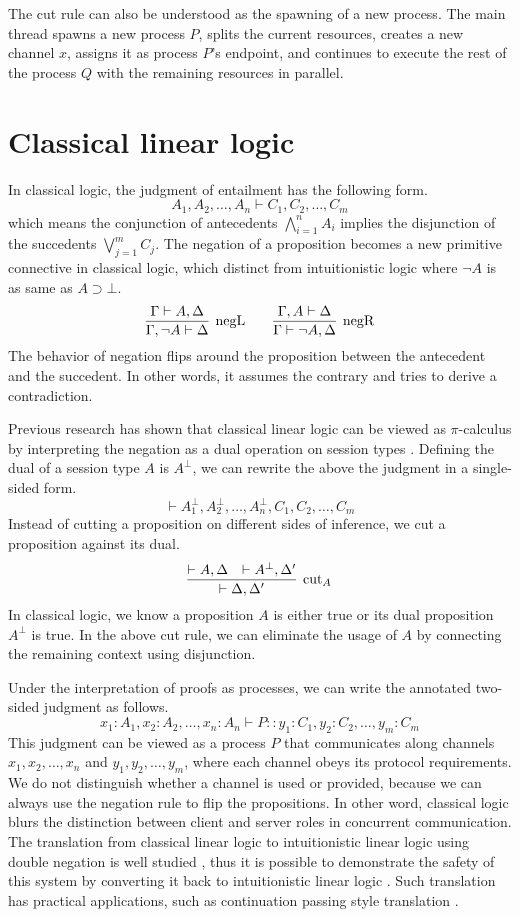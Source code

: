 \documentclass[12pt, openany]{memoir}
\begin{document}
The cut rule can also be understood as the spawning of a new process. 
The main thread spawns a new process $P$, splits the current resources, creates a new channel $x$,
assigns it as process $P$'s endpoint, and continues to execute the rest of the process $Q$ with the remaining resources in parallel.
\section{Classical linear logic} \label{sec:cll}
In classical logic, the judgment of entailment has the following form.
\[
  A_1, A_2, \ldots, A_n \vdash C_1, C_2, \ldots, C_m
\]
which means the conjunction of antecedents $\bigwedge_{i = 1}^n A_i$ implies the disjunction of the succedents $\bigvee_{j = 1}^m C_j$.
The negation of a proposition becomes a new primitive connective in classical logic, which distinct from intuitionistic logic where $\neg A$ is as same as $A \supset \bot$.
\[
  \infer[\text{negL}]{\Gamma, \neg A \vdash \Delta}{\Gamma \vdash A, \Delta}
  \qquad
  \infer[\text{negR}]{\Gamma \vdash \neg A, \Delta}{\Gamma, A \vdash \Delta}
\]
The behavior of negation flips around the proposition between the antecedent and the succedent. 
In other words, it assumes the contrary and tries to derive a contradiction.

Previous research has shown that classical linear logic can be viewed as $\pi$-calculus
by interpreting the negation as a dual operation on session types \cite{Wadler2012}. 
Defining the dual of a session type $A$ is $A^{\bot}$, we can rewrite the above the judgment in a single-sided form.
\[
  \vdash A_1^\bot, A_2^\bot, \ldots, A_n^\bot, C_1, C_2, \ldots, C_m
\]
Instead of cutting a proposition on different sides of inference, we cut a proposition against its dual.
\[
  \infer[\text{cut}_A]{\vdash \Delta, \Delta'}{
    \vdash A, \Delta
    &
    \vdash A^\bot, \Delta'
  }
\]
In classical logic, we know a proposition $A$ is either true or its dual proposition $A^\bot$ is true.
In the above cut rule, we can eliminate the usage of $A$ by connecting the remaining context using disjunction. 

Under the interpretation of proofs as processes, we can write the annotated two-sided judgment as follows.
\[
  x_1 : A_1, x_2 : A_2, \ldots, x_n : A_n \vdash P :: y_1 : C_1, y_2 : C_2, \ldots, y_m : C_m
\]
This judgment can be viewed as a process $P$ that communicates along channels $x_1, x_2, \ldots, x_n$
and $y_1, y_2, \ldots, y_m$, where each channel obeys its protocol requirements.
We do not distinguish whether a channel is used or provided, because we can always use the negation rule to flip the propositions.
In other word, classical logic blurs the distinction between client and server roles in concurrent communication.
The translation from classical linear logic to intuitionistic linear logic using double negation
is well studied \cite{Olivier2018}, 
thus it is possible to demonstrate the safety of this system by converting it back to intuitionistic linear logic \cite{Friedman1978}.
Such translation has practical applications, such as continuation passing style translation \cite{Appel1991}.
\end{document}
